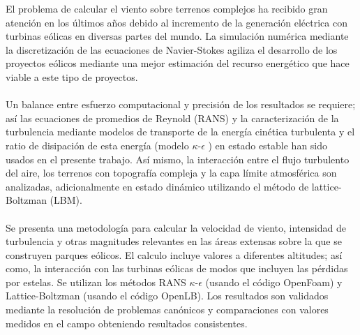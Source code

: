 


\begin{abstracts}        %

El problema de calcular el viento sobre terrenos complejos ha recibido gran atención en los últimos años debido al incremento de la generación eléctrica con turbinas eólicas en diversas partes del mundo. La simulación numérica mediante la discretización de las ecuaciones de Navier-Stokes agiliza el desarrollo de los proyectos eólicos mediante una mejor estimación del recurso energético que hace viable a este tipo de proyectos.
\\
\\
\hspace*{1em} Un balance entre esfuerzo computacional y precisión de los resultados se requiere; así las ecuaciones de promedios de Reynold (RANS) y la caracterización de la  turbulencia mediante modelos de transporte de la energía cinética turbulenta y el ratio de disipación de esta energía (modelo $\kappa$-$\epsilon$ ) en estado estable han sido usados en el presente trabajo. Así mismo, la interacción entre el flujo turbulento del aire, los terrenos con topografía compleja y la capa límite atmosférica son analizadas, adicionalmente en estado dinámico utilizando el método de lattice-Boltzman (LBM).
\\
\\
\hspace*{1em}Se presenta una metodología para calcular la velocidad de viento, intensidad de turbulencia y otras magnitudes relevantes en las áreas extensas sobre la que se construyen parques eólicos. El calculo incluye valores a diferentes altitudes; así como, la interacción con las turbinas eólicas de modos que incluyen las pérdidas por estelas. Se utilizan los métodos RANS $\kappa$-$\epsilon$ (usando el código OpenFoam) y Lattice-Boltzman (usando el código OpenLB). Los resultados son validados mediante la resolución de problemas canónicos y comparaciones con valores medidos en el campo obteniendo resultados consistentes.



\end{abstracts}


